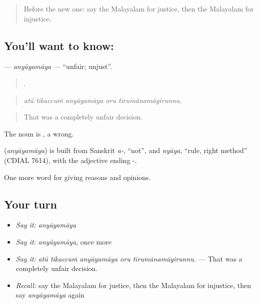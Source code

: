 \label{lesson:ML-C416-anyayamaya}



\begin{quote}
Before the new one: say the Malayalam for justice, then the Malayalam for injustice.
\end{quote}

\subsection*{You'll want to know: }
\textbf{} — \emph{anyāyamāya} — \textquotedblleft{}unfair; unjust\textquotedblright{}.

\begin{quote}
    .
\end{quote}

\begin{quote}
\emph{atŭ tikaccuṁ anyāyamāya oru tīrumānamāyirunnu.}
\end{quote}

\begin{quote}
That was a completely unfair decision.
\end{quote}

The noun is , a wrong.

\begin{cousinweb}
\textbf{} (\emph{anyāyamāya}) is built from Sanskrit \emph{a-}, \textquotedblleft{}not\textquotedblright{}, and \emph{nyāya}, \textquotedblleft{}rule, right method\textquotedblright{} (CDIAL 7614), with the adjective ending -.
\end{cousinweb}

\begin{grammarlens}[title={What you've built}]
One more word for giving reasons and opinions.
\end{grammarlens}

\subsection*{Your turn}
\begin{itemize}
\raggedright
  \item \emph{Say it:} \emph{anyāyamāya}
  \item \emph{Say it:} \emph{anyāyamāya}, once more
  \item \emph{Say it:} \emph{atŭ tikaccuṁ anyāyamāya oru tīrumānamāyirunnu.} — That was a completely unfair decision.
  \item \emph{Recall:} say the Malayalam for justice, then the Malayalam for injustice, then say \emph{anyāyamāya} again
\end{itemize}

